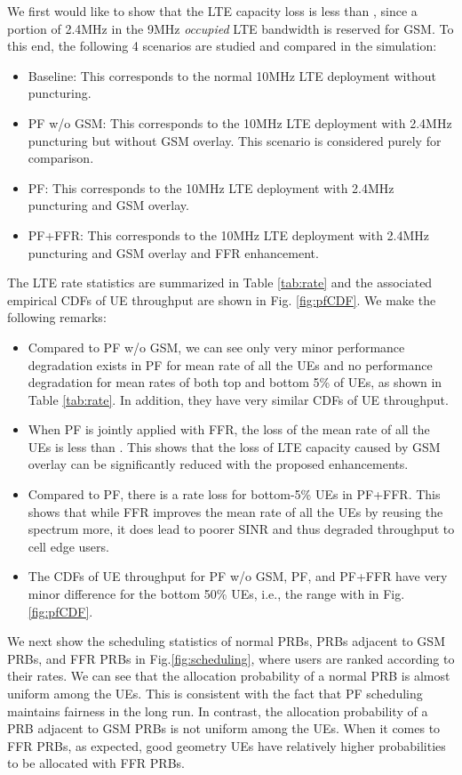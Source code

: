 \documentclass[10pt,journal]{IEEEtran}
\theoremstyle{slplain}
\begin{document}
We first would like to show that the LTE capacity loss is less than , since a portion of 2.4MHz in the 9MHz \textit{occupied} LTE bandwidth is reserved for GSM. To this end, the following 4 scenarios are studied and compared in the simulation:
\begin{itemize}
\item Baseline: This corresponds to the normal 10MHz LTE deployment without puncturing.
\item PF w/o GSM: This corresponds to the 10MHz LTE deployment with 2.4MHz puncturing but without GSM overlay. This scenario is considered purely for comparison.
\item PF: This corresponds to the 10MHz LTE deployment with 2.4MHz puncturing and GSM overlay.
\item PF+FFR: This corresponds to the 10MHz LTE deployment with 2.4MHz puncturing and GSM overlay and FFR enhancement.
\end{itemize}
The LTE rate statistics are summarized in Table \ref{tab:rate} and the associated empirical CDFs of UE throughput are shown in Fig. \ref{fig:pfCDF}. We make the following remarks:
\begin{itemize}
\item Compared to PF w/o GSM, we can see only very minor performance degradation exists in PF for mean rate of all the UEs and no performance degradation for mean rates of both top and bottom 5\% of UEs, as shown in Table \ref{tab:rate}. In addition, they have very similar CDFs of UE throughput.
\item When PF is jointly applied with FFR, the loss of the mean rate of all the UEs is less than . This shows that the loss of LTE capacity caused by GSM overlay can be significantly reduced with the proposed enhancements.
\item Compared to PF, there is  a rate loss for bottom-5\% UEs in PF+FFR. This shows that while FFR improves the mean rate of all the UEs by reusing the spectrum more, it does lead to poorer SINR and thus degraded throughput to cell edge users.
\item The CDFs of UE throughput for PF w/o GSM, PF, and PF+FFR have very minor difference for the bottom 50\% UEs, i.e., the range with  in Fig. \ref{fig:pfCDF}.
\end{itemize}

We next show the scheduling statistics of normal PRBs, PRBs adjacent to GSM PRBs, and FFR PRBs in   Fig.\ref{fig:scheduling}, where users are ranked according to their rates. We can see that the allocation probability of a normal PRB is almost uniform among the UEs. This is consistent with the fact that PF scheduling maintains fairness in the long run. In contrast, the allocation probability of a PRB adjacent to GSM PRBs is not uniform among the UEs. When it comes to FFR PRBs, as expected, good geometry UEs have relatively higher probabilities to be allocated with FFR PRBs.
\end{document}
